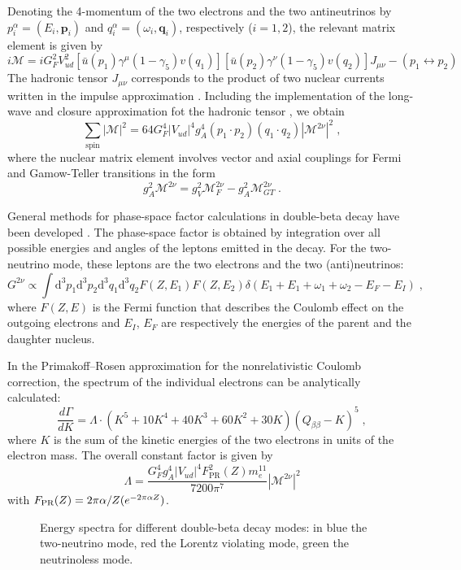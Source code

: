 Denoting the 4-momentum of the two electrons and the two antineutrinos by $p^\alpha_i=(E_i,\mathbf{p}_i)$ and $q^\alpha_i=(\omega_i,\mathbf{q}_i)$, respectively ($i=1,2$), the relevant matrix element is given by
\[i\mathcal{M}=iG^2_FV^2_{ud}[\bar{u}(p_1)\gamma^\mu(1-\gamma_5)v(q_1)][\bar{u}(p_2)\gamma^\nu(1-\gamma_5)v(q_2)]J_{\mu\nu}-(p_1\leftrightarrow p_2)\]
The hadronic tensor $J_{\mu\nu}$ corresponds to the product of two nuclear currents written in the impulse approximation \cite{Tomoda:1991}. Including the implementation of the long-wave and closure approximation fot the hadronic tensor \cite{Tomoda:1991}, we obtain
\[\sum_\text{spin}|\mathcal{M}|^2=64G^4_F|V_{ud}|^4g^4_A(p_1\cdot p_2)(q_1\cdot q_2)|\mathcal{M}^{2\nu}|^2\;,\]
where the nuclear matrix element involves vector and axial couplings for Fermi and Gamow-Teller transitions in the form
\[g^2_A\mathcal{M}^{2\nu}=g^2_V\mathcal{M}^{2\nu}_F-g^2_A\mathcal{M}^{2\nu}_{GT}\;.\]

General methods for phase-space factor calculations in double-beta decay have been developed \cite{Doi:1981,Doi:1983,Tomoda:1991}. The phase-space factor is obtained by integration over all possible energies and angles of the leptons emitted in the decay. For the two-neutrino mode, these leptons are the two electrons and the two (anti)neutrinos:
\[G^{2\nu} \propto \int \text{d}^3p_1\text{d}^3p_2\text{d}^3q_1\text{d}^3q_2F(Z,E_1)F(Z,E_2)\delta(E_1+E_1+\omega_1+\omega_2-E_F-E_I)\;,\]
where $F(Z,E)$ is the Fermi function that describes the Coulomb effect on the outgoing electrons and $E_I$, $E_F$ are respectively the energies of the parent and the daughter nucleus.

In the Primakoff–Rosen approximation \cite{PrimakoffRosen} for the nonrelativistic Coulomb correction, the spectrum of the individual electrons can be analytically calculated:
\[\frac{d\Gamma}{dK}=\Lambda\cdot(K^5+10K^4+40K^3+60K^2+30K)(Q_{\beta\beta}-K)^5\;,\]
where $K$ is the sum of the kinetic energies of the two electrons in units of the electron mass. The overall constant factor is given by
\[\Lambda=\frac{G_F^4g_A^4|V_{ud}|^4F^2_\text{PR}(Z)m_e^{11}}{7200\pi^7}|\mathcal{M}^{2\nu}|^2\]
with $F_\text{PR}(Z)=2\pi\alpha/Z(\-e^{-2\pi\alpha Z})$.
\begin{figure}
	\centering
	
	\caption{Energy spectra for different double-beta decay modes: in blue the two-neutrino mode, red the Lorentz violating mode, green the neutrinoless mode.}
	\label{fig:energyspectra}
\end{figure}

